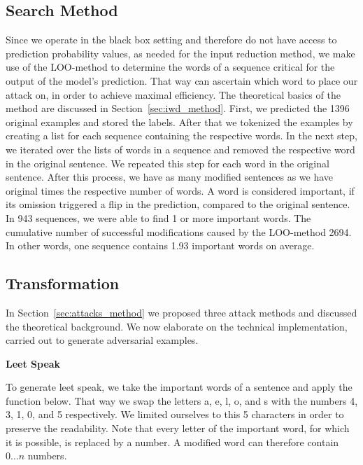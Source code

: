 \subsection{Search Method}
\label{sec:search_method_m}
Since we operate in the black box setting and therefore do not have access to prediction probability values, as needed for the input reduction method, we make use of the LOO-method to determine the words of a sequence critical for the output of the model's prediction. That way can ascertain which word to place our attack on, in order to achieve maximal efficiency. The theoretical basics of the method are discussed in Section~\ref{sec:iwd_method}.
First, we predicted the 1396 original examples and stored the labels. After that we tokenized the examples by creating a list for each sequence containing the respective words. In the next step, we iterated over the lists of words in a sequence and removed the respective word in the original sentence. We repeated this step for each word in the original sentence. 
After this process, we have as many modified sentences as we have original times the respective number of words. A word is considered important, if its omission triggered a flip in the prediction, compared to the original sentence. 
In 943 sequences, we were able to find 1 or more important words. The cumulative number of successful modifications caused by the LOO-method 2694. In other words, one sequence contains 1.93 important words on average.

\subsection{Transformation}
\label{sec:transformation_m}
In Section~\ref{sec:attacks_method} we proposed three attack methods and discussed the theoretical background. We now elaborate on the technical implementation, carried out to generate adversarial examples.

\textbf{Leet Speak}

To generate leet speak, we take the important words of a sentence and apply the function below. That way we swap the letters a, e, l, o, and s with the numbers 4, 3, 1, 0, and 5 respectively. We limited ourselves to this 5 characters in order to preserve the readability. Note that every letter of the important word, for which it is possible, is replaced by a number. A modified word can therefore contain ${0 \dots n}$ numbers.

